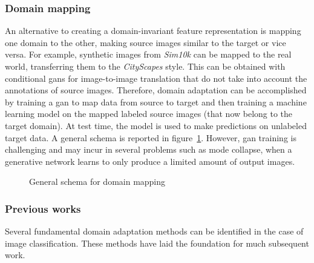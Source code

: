 \documentclass[%
    corpo=12pt,
    twoside,
    stile=classica,   
    tipotesi=magistrale,
    evenboxes,
    english,
	numerazioneromana,
]{toptesi}
\begin{document}
\subsubsection{Domain mapping}
An alternative to creating a domain-invariant feature representation is mapping one domain to the other, making source images similar to the target or vice versa. For example, synthetic images from \textit{Sim10k} can be mapped to the real world, transferring them to the \textit{CityScapes} style. This can be obtained with conditional \glspl{gan} for image-to-image translation that do not take into account the annotations of source images. Therefore, domain adaptation can be accomplished by training a \gls{gan} to map data from source to target and then training a machine learning model on the mapped labeled source images (that now belong to the target domain). At test time, the model is used to make predictions on unlabeled target data. A general schema is reported in figure~\ref{fig:gan}. However, \gls{gan} training is challenging and may incur in several problems such as mode collapse, when a generative network learns to only produce a limited amount of output images.

\begin{figure}[ht]
	\centering
	\caption{General schema for domain mapping\cite{wilson2020survey}}
	\label{fig:gan}
\end{figure}


\subsubsection{Previous works}
Several fundamental domain adaptation methods can be identified in the case of image classification. These methods have laid the foundation for much subsequent work.
\end{document}
